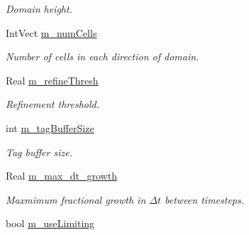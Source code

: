 \begin{DoxyCompactItemize}
\begin{DoxyCompactList}\small\item\em Domain height. \end{DoxyCompactList}\item 
\hypertarget{class_a_m_r_level_mushy_layer_a3b0c04c2f96d9a9ad8bf7dde59b91264}{Int\-Vect \hyperlink{class_a_m_r_level_mushy_layer_a3b0c04c2f96d9a9ad8bf7dde59b91264}{m\-\_\-num\-Cells}}\label{class_a_m_r_level_mushy_layer_a3b0c04c2f96d9a9ad8bf7dde59b91264}

\begin{DoxyCompactList}\small\item\em Number of cells in each direction of domain. \end{DoxyCompactList}\item 
\hypertarget{class_a_m_r_level_mushy_layer_a0687912b630f370dadca349161167b37}{Real \hyperlink{class_a_m_r_level_mushy_layer_a0687912b630f370dadca349161167b37}{m\-\_\-refine\-Thresh}}\label{class_a_m_r_level_mushy_layer_a0687912b630f370dadca349161167b37}

\begin{DoxyCompactList}\small\item\em Refinement threshold. \end{DoxyCompactList}\item 
\hypertarget{class_a_m_r_level_mushy_layer_ab60aa384ccfd15936e9fb822864b7274}{int \hyperlink{class_a_m_r_level_mushy_layer_ab60aa384ccfd15936e9fb822864b7274}{m\-\_\-tag\-Buffer\-Size}}\label{class_a_m_r_level_mushy_layer_ab60aa384ccfd15936e9fb822864b7274}

\begin{DoxyCompactList}\small\item\em Tag buffer size. \end{DoxyCompactList}\item 
\hypertarget{class_a_m_r_level_mushy_layer_a65a0a5abcc272ba9634034ff0fae81d8}{Real \hyperlink{class_a_m_r_level_mushy_layer_a65a0a5abcc272ba9634034ff0fae81d8}{m\-\_\-max\-\_\-dt\-\_\-growth}}\label{class_a_m_r_level_mushy_layer_a65a0a5abcc272ba9634034ff0fae81d8}

\begin{DoxyCompactList}\small\item\em Maxmimum fractional growth in $ \Delta t $ between timesteps. \end{DoxyCompactList}\item 
\hypertarget{class_a_m_r_level_mushy_layer_a5afc0cf82e7f6ccff19bcd39751308f6}{bool \hyperlink{class_a_m_r_level_mushy_layer_a5afc0cf82e7f6ccff19bcd39751308f6}{m\-\_\-use\-Limiting}}\label{class_a_m_r_level_mushy_layer_a5afc0cf82e7f6ccff19bcd39751308f6}


\end{DoxyCompactItemize}
